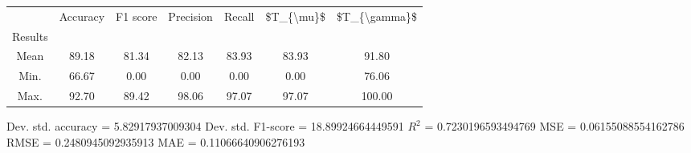 \begin{tabular}{|c|c|c|c|c|c|c|}
\toprule
{} &  Accuracy &  F1 score &  Precision &  Recall &  \$T\_\{\textbackslash mu\}\$ &  \$T\_\{\textbackslash gamma\}\$ \\
Results &           &           &            &         &            &               \\
\hline
Mean    &     89.18 &     81.34 &      82.13 &   83.93 &      83.93 &         91.80 \\
Min.    &     66.67 &      0.00 &       0.00 &    0.00 &       0.00 &         76.06 \\
Max.    &     92.70 &     89.42 &      98.06 &   97.07 &      97.07 &        100.00 \\
\bottomrule
\end{tabular}

 Dev. std. accuracy = 5.82917937009304
 Dev. std. F1-score = 18.89924664449591
 $R^2$ = 0.7230196593494769
 MSE = 0.06155088554162786
 RMSE = 0.2480945092935913
 MAE = 0.11066640906276193